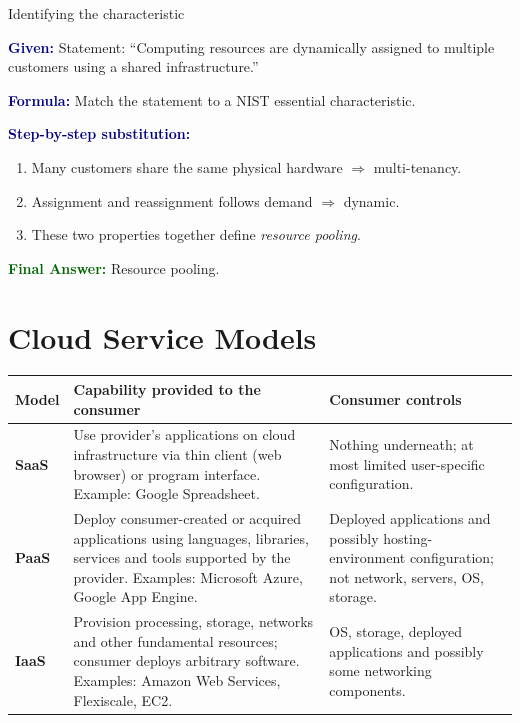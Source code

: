 \documentclass[11pt,a4paper,openany]{report}
\newcommand{\Given}{\par\textbf{\textcolor{navy}{Given:}} }
\newcommand{\Formula}{\par\textbf{\textcolor{navy}{Formula:}} }
\newcommand{\Steps}{\par\textbf{\textcolor{navy}{Step-by-step substitution:}}\par}
\newcommand{\Answer}{\par\textbf{\textcolor{darkgreen}{Final Answer:}} }
\begin{document}
\begin{solved}{Identifying the characteristic}
\Given Statement: ``Computing resources are dynamically assigned to multiple customers using a
shared infrastructure.''
\Formula Match the statement to a NIST essential characteristic.
\Steps
\begin{enumerate}[leftmargin=*]
  \item Many customers share the same physical hardware $\Rightarrow$ multi-tenancy.
  \item Assignment and reassignment follows demand $\Rightarrow$ dynamic.
  \item These two properties together define \emph{resource pooling}.
\end{enumerate}
\Answer Resource pooling.
\end{solved}

\section{Cloud Service Models}
\begin{center}
\begin{tabularx}{\textwidth}{>{\bfseries}lXX}
\toprule
Model & Capability provided to the consumer & Consumer controls\\
\midrule
SaaS & Use provider's applications on cloud infrastructure via thin client (web browser) or
program interface. Example: Google Spreadsheet. & Nothing underneath; at most limited user-specific
configuration.\\
PaaS & Deploy consumer-created or acquired applications using languages, libraries, services and
tools supported by the provider. Examples: Microsoft Azure, Google App Engine. & Deployed
applications and possibly hosting-environment configuration; not network, servers, OS, storage.\\
IaaS & Provision processing, storage, networks and other fundamental resources; consumer deploys
arbitrary software. Examples: Amazon Web Services, Flexiscale, EC2. & OS, storage, deployed
applications and possibly some networking components.\\
\bottomrule
\end{tabularx}
\end{center}
\end{document}
